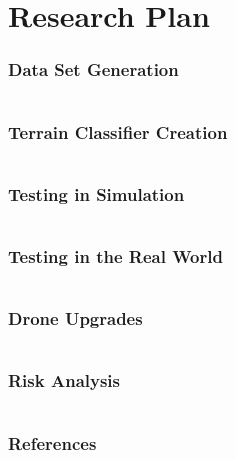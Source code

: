 \documentclass[aspectratio=169]{rubeamer}
\begin{document}
\section{Research Plan}

\begin{frame}
  \frametitle{Data Set Generation}
  \begin{columns}
    \centering
  \end{columns}
\end{frame}

\begin{frame}
  \frametitle{Terrain Classifier Creation}
  \begin{columns}
    \centering
  \end{columns}
\end{frame}

\begin{frame}
  \frametitle{Testing in Simulation}
  \begin{columns}
    \centering
  \end{columns}
\end{frame}

\begin{frame}
  \frametitle{Testing in the Real World}
  \begin{columns}
    \centering
  \end{columns}
\end{frame}

\begin{frame}
  \frametitle{Drone Upgrades}
  \begin{columns}
    \centering
  \end{columns}
\end{frame}

\begin{frame}
  \frametitle{Risk Analysis}
  \begin{columns}
    \centering
  \end{columns}
\end{frame}

\begin{frame}[allowframebreaks]
  \frametitle{References}
  \printbibliography{}
\end{frame}
\end{document}
